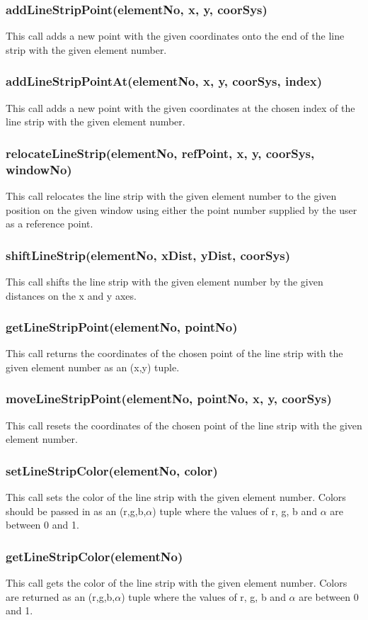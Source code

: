 \documentclass{acm_proc_article-sp}
\begin{document}
\subsubsection{addLineStripPoint(elementNo, x, y, coorSys)}
This call adds a new point with the given coordinates onto the end of the line strip with the given element number.
\subsubsection{addLineStripPointAt(elementNo, x, y, coorSys, index)}
This call adds a new point with the given coordinates at the chosen index of the line strip with the given element number.
\subsubsection{relocateLineStrip(elementNo, refPoint, x, y, coorSys, windowNo)}
This call relocates the line strip with the given element number to the given position on the given window using either the point number supplied by the user as a reference point.
\subsubsection{shiftLineStrip(elementNo, xDist, yDist, coorSys)}
This call shifts the line strip with the given element number by the given distances on the x and y axes.
\subsubsection{getLineStripPoint(elementNo, pointNo)}
This call returns the coordinates of the chosen point of the line strip with the given element number as an (x,y) tuple.
\subsubsection{moveLineStripPoint(elementNo, pointNo, x, y, coorSys)}
This call resets the coordinates of the chosen point of the line strip with the given element number.
\subsubsection{setLineStripColor(elementNo, color)}
This call sets the color of the line strip with the given element number. Colors should be passed in as an (r,g,b,$\alpha$) tuple where the values of r, g, b and $\alpha$ are between 0 and 1.
\subsubsection{getLineStripColor(elementNo)}
This call gets the color of the line strip with the given element number. Colors are returned as an (r,g,b,$\alpha$) tuple where the values of r, g, b and $\alpha$ are between 0 and 1.
\end{document}
